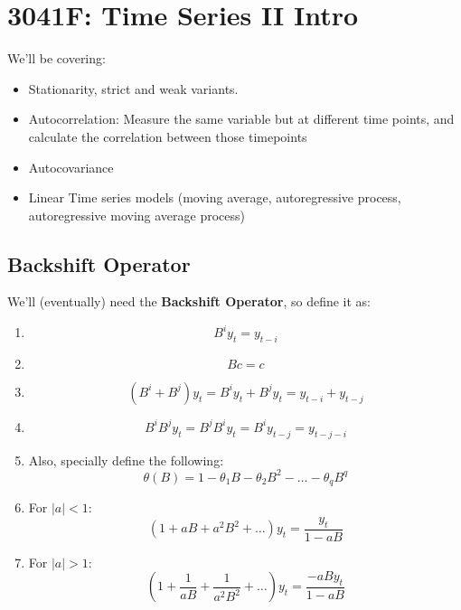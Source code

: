 \section{3041F: Time Series II Intro}
We'll be covering:
\begin{itemize}
    \item Stationarity, strict and weak variants.
    \item Autocorrelation: Measure the same variable but at different time points, and calculate the correlation between those timepoints
    \item Autocovariance
    \item Linear Time series models (moving average, autoregressive process, autoregressive moving average process)
\end{itemize}  

\subsection{Backshift Operator}
We'll (eventually) need the \textbf{Backshift Operator}, so define it as:
\begin{enumerate}
    \item \begin{equation*}
            B^iy_t = y_{t-i}
        \end{equation*}
    \item \begin{equation*}
            Bc = c
        \end{equation*}
    \item \begin{equation*}
            (B^i + B^j)y_t = B^iy_t + B^jy_t = y_{t-i} + y_{t-j}
        \end{equation*}
    \item \begin{equation*}
            B^iB^jy_t = B^jB^iy_t = B^iy_{t-j}= y_{t-j-i}   
        \end{equation*}
    \item Also, specially define the following:\begin{equation*}
            \theta(B) = 1 - \theta_1B - \theta_2B^2 - \dots - \theta_qB^q
    \end{equation*}
    \item For $|a| < 1$: \begin{equation*}
            (1 + aB + a^2B^2 + \dots )y_t = \frac{y_t}{1 - aB}
        \end{equation*}
    \item For $|a| > 1$: \begin{equation*}
            (1 + \frac{1}{aB} + \frac{1}{a^2B^2} + \dots )y_t = \frac{-aBy_t}{1
            - aB}
        \end{equation*}
    
\end{enumerate}

